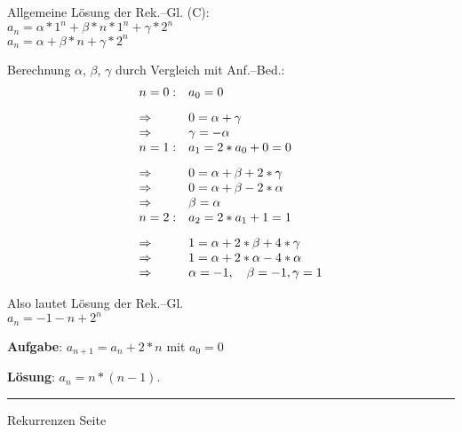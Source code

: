 
\begin{slide}{}

\footnotesize
Allgemeine L\"osung der Rek.--Gl. (C): \\[0.3cm]
\hspace*{1.3cm} $a_n = \alpha * 1^n + \beta * n * 1^n + \gamma * 2^n$ \\[0.3cm]
\hspace*{1.3cm} $a_n = \alpha  + \beta * n + \gamma * 2^n$

Berechnung $\alpha$, $\beta$, $\gamma$ durch Vergleich mit Anf.--Bed.:
$$
\begin{array}[l]{ll}
  n = 0:      & a_0 = 0 \\[0.3cm]
  \Rightarrow & 0 = \alpha + \gamma \\
  \Rightarrow & \gamma = - \alpha \\
  n = 1:      & a_1 = 2 * a_0 + 0 = 0 \\[0.3cm]
  \Rightarrow & 0 = \alpha + \beta + 2 * \gamma \\
  \Rightarrow & 0 = \alpha + \beta - 2 * \alpha \\
  \Rightarrow & \beta = \alpha  \\
  n = 2:      & a_2 = 2 * a_1 + 1 = 1 \\[0.3cm]
  \Rightarrow & 1 = \alpha + 2 * \beta + 4 * \gamma \\
  \Rightarrow & 1 = \alpha + 2 * \alpha - 4 * \alpha \\
  \Rightarrow & \alpha =  - 1,\quad \beta = -1, \gamma = 1 \\
\end{array}
$$

Also lautet L\"osung der Rek.--Gl. \\[0.3cm]
\hspace*{1.3cm} $a_n = -1 - n + 2^n$
\vspace*{1cm}

\textbf{Aufgabe}: $a_{n + 1} = a_n + 2 * n$ \quad mit $a_0 = 0$
\vspace*{1cm}

\textbf{L\"osung}: $a_n = n * (n - 1)$.


\vspace*{\fill}
\tiny \addtocounter{mypage}{1}
\rule{17cm}{1mm}
Rekurrenzen  \hspace*{\fill} Seite 
\end{slide}


